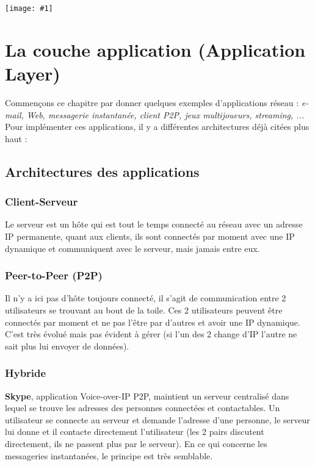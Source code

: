 \documentclass{article}
\newcommand{\imgR}[2]{\begin{center}\texttt{[image: \#1]}\end{center}}
\begin{document}
\imgR{CN_012.png}{300}

\hbox{\raisebox{0.4em}{\vrule depth 0.4pt height 0.4pt width 10cm}}

\section{La couche application (Application Layer)}

Commençons ce chapitre par donner quelques exemples d'applications réseau : \textit{e-mail, Web, messagerie 
instantanée, client P2P, jeux multijoueurs, streaming, ...} Pour implémenter ces applications, il y a différentes
architectures déjà citées plus haut : 

\subsection{Architectures des applications}

\subsubsection{Client-Serveur}

Le serveur est un hôte qui est tout le temps connecté au réseau avec un adresse IP permanente, quant aux clients,
ils sont connectés par moment avec une IP dynamique et communiquent avec le serveur, mais jamais entre eux.

\subsubsection{Peer-to-Peer (P2P)}

Il n'y a ici pas d'hôte toujours connecté, il s'agit de communication entre 2 utilisateurs se trouvant au bout de
la toile. Ces 2 utilisateurs peuvent être connectés par moment et ne pas l'être par d'autres et avoir une IP 
dynamique. C'est très évolué mais pas évident à gérer (si l'un des 2 change d'IP l'autre ne sait plus lui envoyer
de données).

\subsubsection{Hybride}

\textbf{Skype}, application Voice-over-IP P2P, maintient un serveur centralisé dans lequel se trouve les adresses
des personnes connectées et contactables. Un utilisateur se connecte au serveur et demande l'adresse d'une 
personne, le serveur lui donne et il contacte directement l'utilisateur (les 2 pairs discutent directement, ils 
ne passent plus par le serveur). En ce qui concerne les messageries instantanées, le principe est très semblable.
\end{document}
